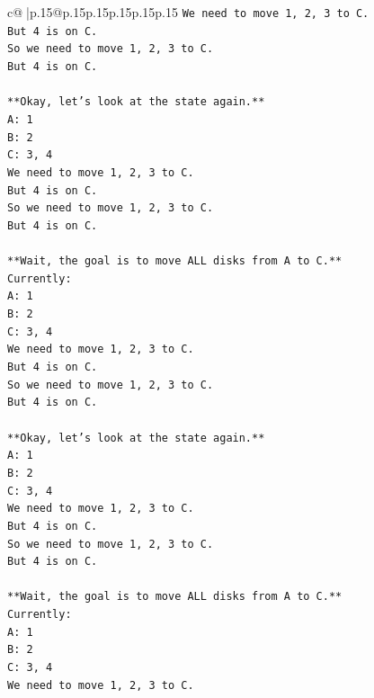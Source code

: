 \documentclass{article}
\begin{document}
{\begin{supertabular}{c@{$\;$}|p{.15\linewidth}@{}p{.15\linewidth}p{.15\linewidth}p{.15\linewidth}p{.15\linewidth}p{.15\linewidth}}
{{{\texttt{We need to move 1, 2, 3 to C.} \\
\texttt{But 4 is on C.} \\
\texttt{So we need to move 1, 2, 3 to C.} \\
\texttt{But 4 is on C.} \\
\\ 
\texttt{**Okay, let's look at the state again.**} \\
\texttt{A: 1} \\
\texttt{B: 2} \\
\texttt{C: 3, 4} \\
\texttt{We need to move 1, 2, 3 to C.} \\
\texttt{But 4 is on C.} \\
\texttt{So we need to move 1, 2, 3 to C.} \\
\texttt{But 4 is on C.} \\
\\ 
\texttt{**Wait, the goal is to move ALL disks from A to C.**} \\
\texttt{Currently:} \\
\texttt{A: 1} \\
\texttt{B: 2} \\
\texttt{C: 3, 4} \\
\texttt{We need to move 1, 2, 3 to C.} \\
\texttt{But 4 is on C.} \\
\texttt{So we need to move 1, 2, 3 to C.} \\
\texttt{But 4 is on C.} \\
\\ 
\texttt{**Okay, let's look at the state again.**} \\
\texttt{A: 1} \\
\texttt{B: 2} \\
\texttt{C: 3, 4} \\
\texttt{We need to move 1, 2, 3 to C.} \\
\texttt{But 4 is on C.} \\
\texttt{So we need to move 1, 2, 3 to C.} \\
\texttt{But 4 is on C.} \\
\\ 
\texttt{**Wait, the goal is to move ALL disks from A to C.**} \\
\texttt{Currently:} \\
\texttt{A: 1} \\
\texttt{B: 2} \\
\texttt{C: 3, 4} \\
\texttt{We need to move 1, 2, 3 to C.} \\
}}}
\end{supertabular}}
\end{document}
